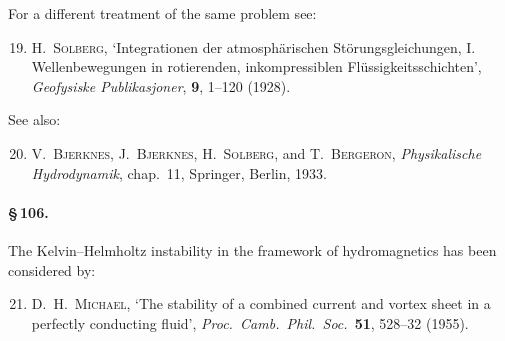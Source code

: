 \noindent
For a different treatment of the same problem see:

\begin{enumerate}\setcounter{enumi}{18}
\item H.~\textsc{Solberg}, `Integrationen der atmosph\"arischen
  St\"orungsgleichungen, I.
  Wellenbewegungen in rotierenden, inkompressiblen Fl\"ussigkeitsschichten',
  \emph{Geofysiske Publikasjoner}, \textbf{9}, 1--120 (1928).
\end{enumerate}

\noindent
See also:

\begin{enumerate}\setcounter{enumi}{19}
\item V.~\textsc{Bjerknes}, J.~\textsc{Bjerknes}, H.~\textsc{Solberg},
  and T.~\textsc{Bergeron},
  \emph{Physikalische Hydrodynamik}, chap.~11, Springer, Berlin, 1933.
\end{enumerate}

\paragraph{\S\,106.}
The Kelvin--Helmholtz instability in the framework of hydromagnetics has
been considered by:

\begin{enumerate}\setcounter{enumi}{20}
\item D.~H.~\textsc{Michael}, `The stability of a combined current and vortex sheet
  in a perfectly conducting fluid',
  \emph{Proc.\ Camb.\ Phil.\ Soc.}\ \textbf{51}, 528--32 (1955).
\end{enumerate}
